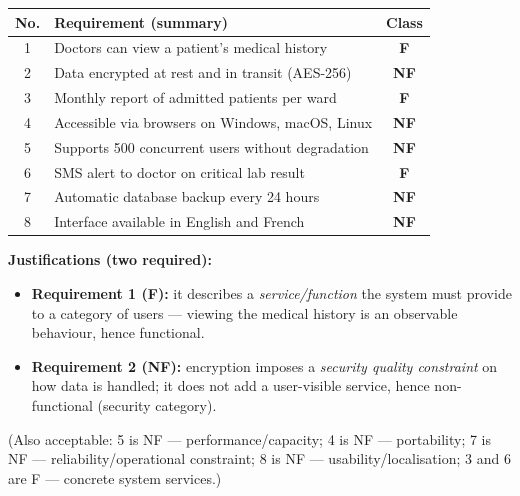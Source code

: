 \documentclass[11pt]{article}
\begin{document}
\begin{corrige}
\begin{center}
\begin{tabularx}{\linewidth}{|c|X|c|}\hline
\rowcolor{popblueL} \textbf{No.} & \textbf{Requirement (summary)} & \textbf{Class} \\ \hline
1 & Doctors can view a patient's medical history & \textbf{F} \\ \hline
2 & Data encrypted at rest and in transit (AES-256) & \textbf{NF} \\ \hline
3 & Monthly report of admitted patients per ward & \textbf{F} \\ \hline
4 & Accessible via browsers on Windows, macOS, Linux & \textbf{NF} \\ \hline
5 & Supports 500 concurrent users without degradation & \textbf{NF} \\ \hline
6 & SMS alert to doctor on critical lab result & \textbf{F} \\ \hline
7 & Automatic database backup every 24 hours & \textbf{NF} \\ \hline
8 & Interface available in English and French & \textbf{NF} \\ \hline
\end{tabularx}
\end{center}

\textbf{Justifications (two required):}
\begin{itemize}
    \item \textbf{Requirement 1 (F):} it describes a \emph{service/function} the system must provide to a category of users — viewing the medical history is an observable behaviour, hence functional.
    \item \textbf{Requirement 2 (NF):} encryption imposes a \emph{security quality constraint} on how data is handled; it does not add a user-visible service, hence non-functional (security category).
\end{itemize}
(Also acceptable: 5 is NF — performance/capacity; 4 is NF — portability; 7 is NF — reliability/operational constraint; 8 is NF — usability/localisation; 3 and 6 are F — concrete system services.)
\end{corrige}
\end{document}
